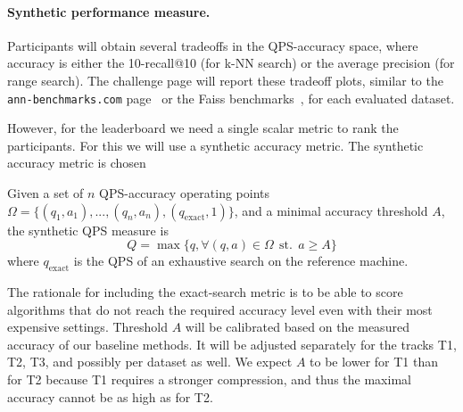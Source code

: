 \fi




\paragraph{Synthetic performance measure.}


Participants will obtain several tradeoffs in the QPS-accuracy space,
where accuracy is either the 10-recall@10 (for k-NN search) or the
average precision (for range search).  
The challenge page will report
these tradeoff plots, similar to the {\tt ann-benchmarks.com}
page~\cite{Benchmark} or the Faiss benchmarks~\cite{FaissBenchmarks},
for each evaluated dataset.

However, for the leaderboard we need a single scalar metric to rank the participants. 
For this we will use a synthetic accuracy metric. 
The synthetic accuracy metric is chosen 

\iffalse 

\begin{definition}
  \label{def:syntheticmetric}
  Given a set of $n$ QPS-accuracy operating points $\Omega = \{(q_1, a_1), ..., (q_n, a_n), (q_\mathrm{exact}, 1)\}$, 
  and a minimal accuracy threshold $A$,   the synthetic QPS measure is 
  \[
Q =  \max \{ q, \forall (q, a)\in \Omega \ \ \mathrm{st.}\ \  a\ge A \}
  \]
  where $q_\mathrm{exact}$ is the QPS of an exhaustive search on the reference machine.
\end{definition}


The rationale for including the exact-search metric is to be able to score algorithms that do not reach the required accuracy level even with their most expensive settings.
Threshold $A$ will be calibrated based on the measured accuracy of our baseline methods. 
It will be adjusted separately for the tracks T1, T2, T3, and possibly per dataset as well. 
We expect $A$ to be lower for T1 than for T2 because T1 requires a stronger compression, and thus the maximal accuracy cannot be as high as for T2.


